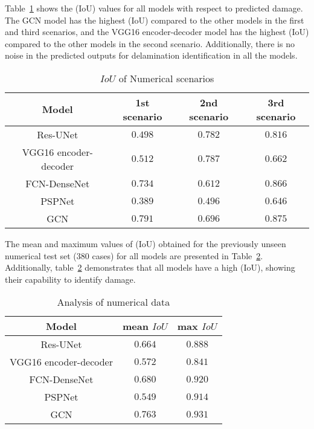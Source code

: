Table~\ref{tab:table_numerical_scenarios} shows the (IoU) values for all models with respect to predicted damage.
The GCN model has the highest (IoU) compared to the other models in the first and third scenarios, and the VGG16 encoder-decoder model has the highest (IoU) compared to the other models in the second scenario.
Additionally, there is no noise in the predicted outputs for delamination identification in all the models.
\begin{table}[]
	\centering
	\caption{\(IoU\) of Numerical scenarios}
	\label{tab:table_numerical_scenarios}
	\resizebox{\textwidth}{!}
	{
		\begin{tabular}{cccc}\hline
			Model & 1st scenario & 2nd scenario & 3rd scenario \\ \hline
			Res-UNet & \(0.498\) & \(0.782\) & \(0.816\) \\ 
			VGG16 encoder-decoder & \(0.512\) & \(0.787\) & \(0.662\) \\
			FCN-DenseNet & \(0.734\) & \(0.612\) & \(0.866\) \\ 
			PSPNet & \(0.389\) & \(0.496\) & \(0.646\) \\ 
			GCN & \(0.791\) & \(0.696\) & \(0.875\) \\ \hline
		\end{tabular}
	}
\end{table}

The mean and maximum values of (IoU) obtained for the previously unseen numerical test set (380 cases) for all models are presented in Table~\ref{tab:table_iou}.
Additionally, table~\ref{tab:table_iou} demonstrates that all models have a high (IoU), showing their capability to identify damage.
\begin{table}[]
	\centering
	\caption{Analysis of numerical data}
	\label{tab:table_iou}
	\begin{tabular}{ccc}\hline
		Model & mean \(IoU\) & max \(IoU\) \\ \hline
		Res-UNet & \(0.664\) & \(0.888\) \\ 
		VGG16 encoder-decoder & \(0.572\) & \(0.841\) \\ 
		FCN-DenseNet & \(0.680\) & \(0.920\) \\ 
		PSPNet & \(0.549\) & \(0.914\) \\ 
		GCN & \(0.763\) & \(0.931\) \\ \hline
	\end{tabular}
\end{table}

